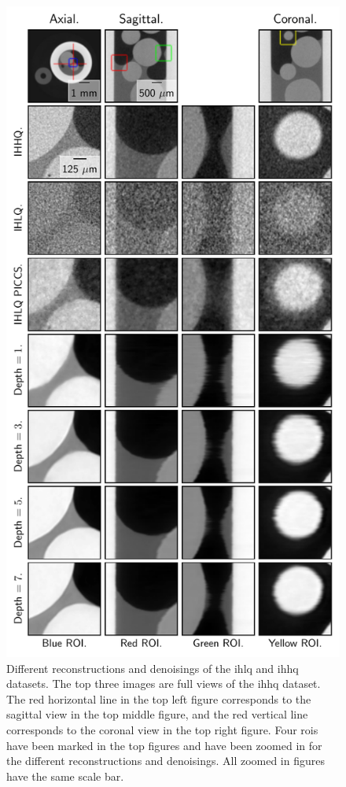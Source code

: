 \begin{figure}[htbp]
  \centering
  \includegraphics[width=.8\textwidth]{figures/bigfigure.pdf}
  \caption[Different reconstructions and denoisings of the IHLQ and IHHQ datasets]{Different reconstructions and denoisings of the \gls{ihlq} and \gls{ihhq} datasets. The top three images are full views of the \gls{ihhq} dataset. The red horizontal line in the top left figure corresponds to the sagittal view in the top middle figure, and the red vertical line corresponds to the coronal view in the top right figure. Four \glspl{roi} have been marked in the top figures and have been zoomed in for the different reconstructions and denoisings. All zoomed in figures have the same scale bar. }
  \label{fig:bigfig}
\end{figure}


